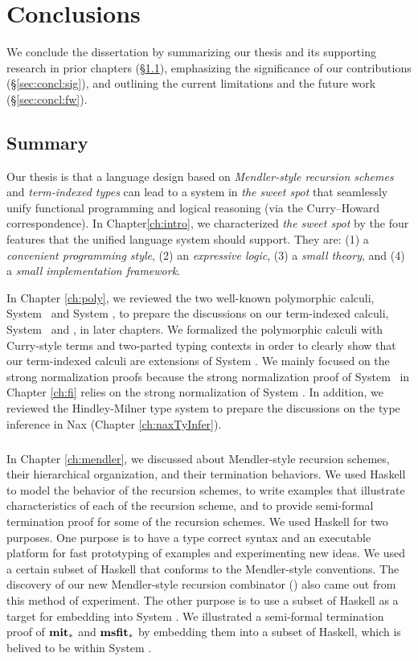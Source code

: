 \chapter{Conclusions}\label{ch:concl}
We conclude the dissertation by summarizing our thesis and
its supporting research in prior chapters (\S\ref{sec:concl:summary}),
emphasizing the significance of our contributions (\S\ref{sec:concl:sig}), and
outlining the current limitations and the future work (\S\ref{sec:concl:fw}).

\section{Summary}\label{sec:concl:summary}
Our thesis is that a language design based on
\emph{Mendler-style recursion schemes} and \emph{term-indexed types}
can lead to a system in \emph{the sweet spot} that seamlessly unify
functional programming and logical reasoning
(via the Curry--Howard correspondence).
In Chapter\ref{ch:intro}, we characterized \emph{the sweet spot} by
the four features that the unified language system should support.
They are: (1) a \emph{convenient programming style},
(2) an \emph{expressive logic}, (3) a \emph{small theory}, and
(4) a \emph{small implementation framework}.

In Chapter \ref{ch:poly}, we reviewed the two well-known polymorphic calculi,
System \F\ and System \Fw, to prepare the discussions on
our term-indexed calculi, System \Fi\ and \Fixi, in later chapters.
We formalized the polymorphic calculi with Curry-style terms and
two-parted typing contexts in order to clearly show that
our term-indexed calculi are extensions of System \Fw.
We mainly focused on the strong normalization proofs
because the strong normalization proof of System \Fi\ in Chapter \ref{ch:fi}
relies on the strong normalization of System \Fw.
In addition, we reviewed the Hindley-Milner type system to prepare
the discussions on the type inference in Nax (Chapter \ref{ch:naxTyInfer}).

\paragraph{}
In Chapter \ref{ch:mendler}, we discussed about Mendler-style recursion schemes,
their hierarchical organization, and their termination behaviors.
We used Haskell to model the behavior of the recursion schemes, to write
examples that illustrate characteristics of each of the recursion scheme,
and to provide semi-formal termination proof for some of the recursion
schemes. We used Haskell for two purposes.
One purpose is to have a type correct syntax and an executable platform for
fast prototyping of examples and experimenting new ideas. We used a certain
subset of Haskell that conforms to the Mendler-style conventions.
The discovery of our new Mendler-style recursion combinator (\MsfIt)
also came out from this method of experiment.
The other purpose is to use a subset of Haskell as a target for embedding
into System \Fw. We illustrated a semi-formal termination proof of
$\mathbf{mit}_{*}$ and $\mathbf{msfit}_{*}$ by embedding them into a subset of Haskell,
which is belived to be within System \Fw.

